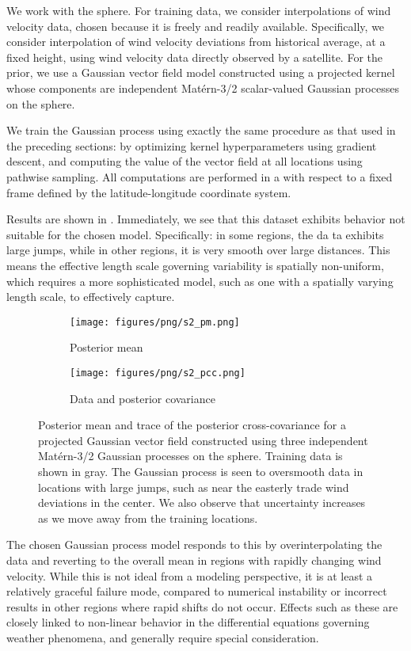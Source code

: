 \documentclass[11pt]{book}
\begin{document}
We work with the sphere.
For training data, we consider interpolations of wind velocity data, chosen because it is freely and readily available.
Specifically, we consider interpolation of wind velocity deviations from historical average, at a fixed height, using wind velocity data directly observed by a satellite.
For the prior, we use a Gaussian vector field model constructed using a projected kernel whose components are independent Matérn-3/2 scalar-valued Gaussian processes on the sphere.

We train the Gaussian process using exactly the same procedure as that used in the preceding sections: by optimizing kernel hyperparameters using gradient descent, and computing the value of the vector field at all locations using pathwise sampling.
All computations are performed in a with respect to a fixed frame defined by the latitude-longitude coordinate system.

Results are shown in .
Immediately, we see that this dataset exhibits behavior not suitable for the chosen model.
Specifically: in some regions, the da ta exhibits large jumps, while in other regions, it is very smooth over large distances.
This means the effective length scale governing variability is spatially non-uniform, which requires a more sophisticated model, such as one with a spatially varying length scale, to effectively capture.

\begin{figure}
\begin{subfigure}{0.49\textwidth}
\texttt{[image: figures/png/s2\_pm.png]}
\caption{Posterior mean}
\end{subfigure}
\begin{subfigure}{0.49\textwidth}
\texttt{[image: figures/png/s2\_pcc.png]}
\caption{Data and posterior covariance}
\end{subfigure}
\caption[Posterior Gaussian vector field: climate data]{Posterior mean and trace of the posterior cross-covariance for a projected Gaussian vector field constructed using three independent Matérn-3/2 Gaussian processes on the sphere. Training data is shown in gray. The Gaussian process is seen to oversmooth data in locations with large jumps, such as near the easterly trade wind deviations in the center. We also observe that uncertainty increases as we move away from the training locations.}
\label{fig:posterior-vector-field}
\end{figure}

The chosen Gaussian process model responds to this by overinterpolating the data and reverting to the overall mean in regions with rapidly changing wind velocity.
While this is not ideal from a modeling perspective, it is at least a relatively graceful failure mode, compared to numerical instability or incorrect results in other regions where rapid shifts do not occur.
Effects such as these are closely linked to non-linear behavior in the differential equations governing weather phenomena, and generally require special consideration.
\end{document}
